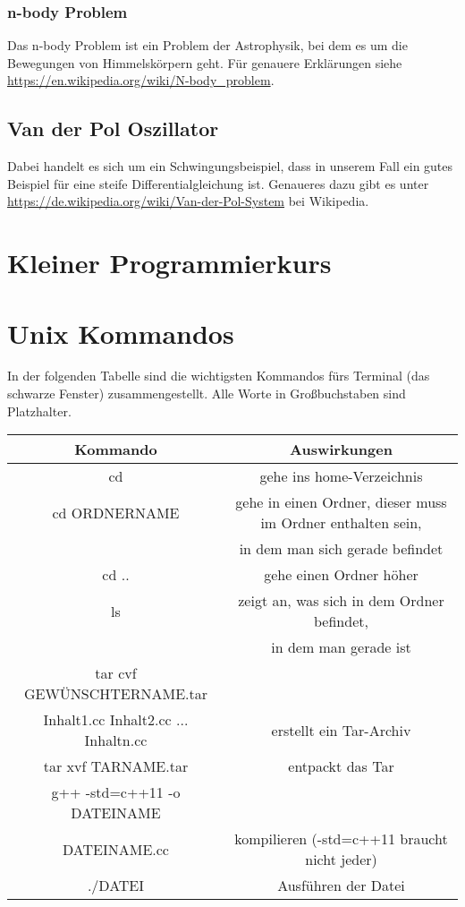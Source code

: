 \documentclass[a4paper,11pt]{article}
\theoremstyle{definition}
\begin{document}
\subsubsection{n-body Problem}
Das n-body Problem ist ein Problem der Astrophysik, bei dem es um die Bewegungen von Himmelskörpern geht. Für genauere Erklärungen siehe \url{https://en.wikipedia.org/wiki/N-body_problem}.

\subsection{Van der Pol Oszillator}
Dabei handelt es sich um ein Schwingungsbeispiel, dass in unserem Fall ein gutes Beispiel für eine steife Differentialgleichung ist. Genaueres dazu gibt es unter \url{https://de.wikipedia.org/wiki/Van-der-Pol-System} bei Wikipedia.




\begin{appendices}

\section{Kleiner Programmierkurs}

\section{Unix Kommandos}
In der folgenden Tabelle sind die wichtigsten Kommandos fürs Terminal (das schwarze Fenster) zusammengestellt. Alle Worte in Großbuchstaben sind Platzhalter.


\begin{tabular}{|c|c|}\hline
   Kommando & Auswirkungen \\ \hline
   cd & gehe ins home-Verzeichnis \\ \hline
   cd ORDNERNAME & gehe in einen Ordner, dieser muss im Ordner enthalten sein, \\ & in dem man sich gerade befindet \\ \hline
   cd .. & gehe einen Ordner höher \\ \hline
   ls & zeigt an, was sich in dem Ordner befindet, \\
   & in dem man gerade ist \\ \hline
   tar cvf GEWÜNSCHTERNAME.tar & \\  Inhalt1.cc Inhalt2.cc ... Inhaltn.cc & erstellt ein Tar-Archiv \\ \hline
   tar xvf TARNAME.tar  & entpackt das Tar \\ \hline
   g++ -std=c++11 -o DATEINAME & \\  DATEINAME.cc & kompilieren (-std=c++11 braucht nicht jeder) \\ \hline
   ./DATEI & Ausführen der Datei \\ \hline


 \end{tabular}

\end{appendices}



\end{document}
